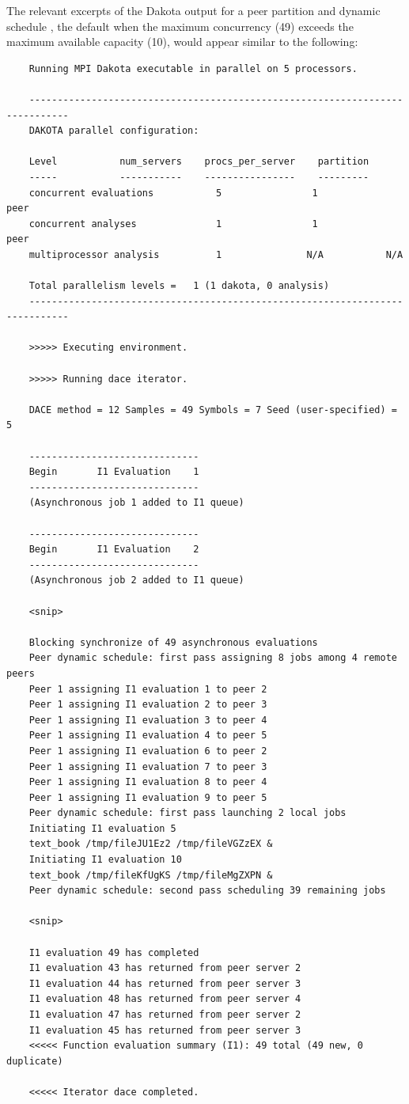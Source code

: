 The relevant excerpts of the Dakota output for a peer partition and dynamic schedule
, the default when the maximum concurrency
(49) exceeds the maximum available capacity (10), would appear similar
to the following:
\begin{small}
\begin{verbatim}
    Running MPI Dakota executable in parallel on 5 processors.
    
    -----------------------------------------------------------------------------
    DAKOTA parallel configuration:
    
    Level			num_servers    procs_per_server    partition
    -----			-----------    ----------------    ---------
    concurrent evaluations           5                1            peer
    concurrent analyses              1                1            peer
    multiprocessor analysis          1               N/A           N/A
    
    Total parallelism levels =   1 (1 dakota, 0 analysis)
    -----------------------------------------------------------------------------
    
    >>>>> Executing environment.
    
    >>>>> Running dace iterator.
    
    DACE method = 12 Samples = 49 Symbols = 7 Seed (user-specified) = 5
    
    ------------------------------
    Begin       I1 Evaluation    1
    ------------------------------
    (Asynchronous job 1 added to I1 queue)
    
    ------------------------------
    Begin       I1 Evaluation    2
    ------------------------------
    (Asynchronous job 2 added to I1 queue)
    
    <snip>
    
    Blocking synchronize of 49 asynchronous evaluations
    Peer dynamic schedule: first pass assigning 8 jobs among 4 remote peers
    Peer 1 assigning I1 evaluation 1 to peer 2
    Peer 1 assigning I1 evaluation 2 to peer 3
    Peer 1 assigning I1 evaluation 3 to peer 4
    Peer 1 assigning I1 evaluation 4 to peer 5
    Peer 1 assigning I1 evaluation 6 to peer 2
    Peer 1 assigning I1 evaluation 7 to peer 3
    Peer 1 assigning I1 evaluation 8 to peer 4
    Peer 1 assigning I1 evaluation 9 to peer 5
    Peer dynamic schedule: first pass launching 2 local jobs
    Initiating I1 evaluation 5
    text_book /tmp/fileJU1Ez2 /tmp/fileVGZzEX &
    Initiating I1 evaluation 10
    text_book /tmp/fileKfUgKS /tmp/fileMgZXPN &
    Peer dynamic schedule: second pass scheduling 39 remaining jobs
    
    <snip>
    
    I1 evaluation 49 has completed
    I1 evaluation 43 has returned from peer server 2
    I1 evaluation 44 has returned from peer server 3
    I1 evaluation 48 has returned from peer server 4
    I1 evaluation 47 has returned from peer server 2
    I1 evaluation 45 has returned from peer server 3
    <<<<< Function evaluation summary (I1): 49 total (49 new, 0 duplicate)
    
    <<<<< Iterator dace completed.
\end{verbatim}
\end{small}
